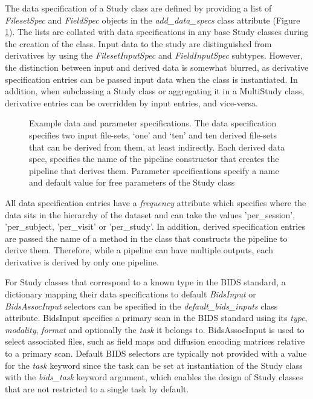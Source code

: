 \documentclass[smallextended]{svjour3}       %
\begin{document}
The data specification of a Study class are defined by providing a
list of \emph{FilesetSpec} and \emph{FieldSpec} objects in the
\emph{add\_data\_specs} class attribute (Figure \ref{fig:data_spec}).
The lists are collated with data specifications in any base Study
classes during the creation of the class. Input data to the study are
distinguished from derivatives by using the \emph{FilesetInputSpec}
and \emph{FieldInputSpec} subtypes. However, the distinction between
input and derived data is somewhat blurred, as derivative specification
entries can be passed input data when the class is instantiated. In addition,
when subclassing a Study class or aggregating it in a MultiStudy class,
derivative entries can be overridden by input entries, and vice-versa.

\begin{figure}

\caption{Example data and parameter specifications. The data
specification specifies two input file-sets, `one' and `ten' and
ten derived file-sets that can be derived from them, at least
indirectly. Each derived data spec, specifies the name of the pipeline
constructor that creates the pipeline that derives them. Parameter
specifications specify a name and default value for free parameters of
the Study class}
\label{fig:data_spec}
\end{figure}

All data specification entries have a \emph{frequency} attribute which specifies
where the data sits in the hierarchy of the
dataset and can take the values 'per\_session',
'per\_subject, 'per\_visit' or 'per\_study'. In
addition, derived specification entries are passed the name of a method in the
class that constructs the pipeline to derive them. Therefore, while a
pipeline can have multiple outputs, each derivative is derived by only
one pipeline.

For Study classes that correspond to a known type in the BIDS
standard, a dictionary mapping their data specifications to default
\emph{BidsInput} or \emph{BidsAssocInput} selectors can be specified in the
\emph{default\_bids\_inputs} class attribute. BidsInput
specifies a primary scan in the BIDS standard using its \emph{type}, \emph{modality},
\emph{format} and optionally the \emph{task} it belongs to. BidsAssocInput is used to select
associated files, such as field maps and diffusion encoding matrices relative
to a primary scan. Default BIDS selectors are typically not provided with
a value for the \emph{task} keyword since the task can be set at instantiation of
the Study class with the \emph{bids\_task} keyword argument, which enables the design of Study
classes that are not restricted to a single task by default.
\end{document}
